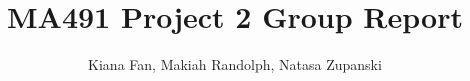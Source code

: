 \documentclass{article}
\begin{document}
\title{MA491 Project 2 Group Report}
\author{Kiana Fan, Makiah Randolph, Natasa Zupanski}
\maketitle

\printbibliography
\end{document}
